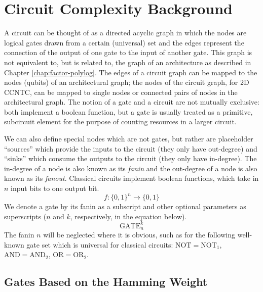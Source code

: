 \section{Circuit Complexity Background}
\label{sec:fsl-circuits}

A circuit can be thought of as a directed acyclic graph in which the nodes are
logical gates drawn from a certain (universal) set and the edges 
represent
the connection of the output of one gate to the input of another
gate. This graph is not equivalent to, but is related to, the graph of an architecture
as described in Chapter \ref{chap:factor-polylog}. The edges of a circuit graph can
be mapped to the nodes (qubits) of an architectural graph; the nodes of the
circuit graph, for 2D CCNTC, can be mapped to single nodes or connected pairs of nodes
in the architectural graph. The notion of a gate and a circuit are not mutually
exclusive: both implement a boolean function, but a gate is usually treated as
a primitive, subcircuit element for the purpose of counting resources in a larger circuit.


We can also define special nodes which are not gates, but rather
are placeholder ``sources'' which provide the inputs to the circuit (they only
have out-degree) and 
``sinks'' which consume the outputs to the circuit (they only have in-degree).
The in-degree of a 
node is also known as its \emph{fanin} and the out-degree of a node is
also known as its \emph{fanout}.
Classical circuits implement boolean functions, which take in $n$ input
bits to one output bit.
%
\begin{equation}
f:\{0,1\}^n \rightarrow \{0,1\}
\end{equation}
%
We denote a gate by its fanin as a subscript and other optional
parameters as superscripts ($n$ and $k$, respectively, in the equation below).
%
\begin{equation}
\text{GATE}_n^k
\end{equation}
%
The fanin $n$ will be neglected where it is obvious,
such as for the following well-known gate set which is universal
for classical circuits: $\text{NOT} = \text{NOT}_1$, 
$\text{AND} = \text{AND}_2$, $\text{OR} = \text{OR}_2$.

\subsection{Gates Based on the Hamming Weight}


